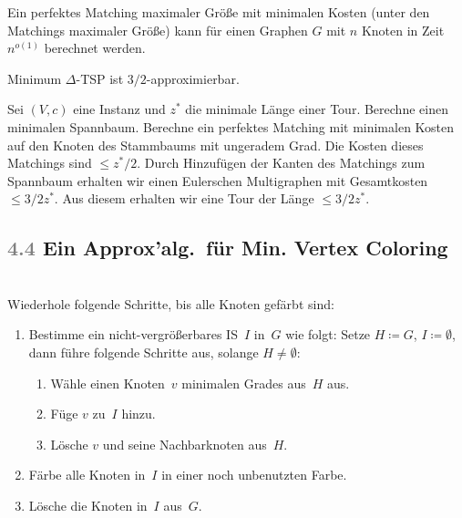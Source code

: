 \documentclass{cheat-sheet}
\newcommand{\Algorithm}[1]{\textcolor{AlgorithmColor}{\textbf{#1}}}
\newcommand{\Problem}[1]{\textcolor{ProblemColor}{\textbf{#1}}}
\newcommand{\scriptSection}[1]{\textcolor{gray}{#1}\enspace}
\begin{document}
\begin{satz}
  Ein perfektes Matching maximaler Größe mit minimalen Kosten (unter den Matchings maximaler Größe) kann für einen Graphen $G$ mit $n$ Knoten in Zeit $n^{o(1)}$ berechnet werden.
\end{satz}

\begin{satz}
  Minimum $\Delta$-TSP ist $3/2$-approximierbar.
\end{satz}

\begin{samepage}

\begin{beweisskizze}
  Sei $(V, c)$ eine Instanz und $z^*$ die minimale Länge einer Tour.
  Berechne einen minimalen Spannbaum.
  Berechne ein perfektes Matching mit minimalen Kosten auf den Knoten des Stammbaums mit ungeradem Grad.
  Die Kosten dieses Matchings sind $\leq z^* / 2$.
  Durch Hinzufügen der Kanten des Matchings zum Spannbaum erhalten wir einen Eulerschen Multigraphen mit Gesamtkosten $\leq 3/2 z^*$.
  Aus diesem erhalten wir eine Tour der Länge $\leq 3/2 z^*$.
\end{beweisskizze}

\subsection{\scriptSection{4.4} Ein Approx'alg.\ für \Problem{Min. Vertex Coloring}}

\begin{alg}[\Algorithm{Greedy Vertex Coloring}] \mbox{}\\
  Wiederhole folgende Schritte, bis alle Knoten gefärbt sind:
  \begin{enumerate}
    \item
      Bestimme ein nicht-vergrößerbares IS~$I$ in~$G$ wie folgt: Setze $H \coloneqq G$, $I \coloneqq \emptyset$, dann führe folgende Schritte aus, solange $H \neq \emptyset$:
      \begin{enumerate}
        \item Wähle einen Knoten~$v$ minimalen Grades aus~$H$ aus.
        \item Füge $v$ zu~$I$ hinzu.
        \item Lösche $v$ und seine Nachbarknoten aus~$H$.
      \end{enumerate}
    \item Färbe alle Knoten in~$I$ in einer noch unbenutzten Farbe.
    \item Lösche die Knoten in~$I$ aus~$G$.
  \end{enumerate}
\end{alg}

\end{samepage}
\end{document}
